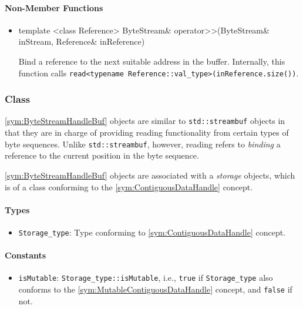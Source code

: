 \paragraph{Non-Member Functions}

\begin{itemize}
	\item
		\begin{cppsnippet}
		template <class Reference>
		ByteStream& operator>>(ByteStream& inStream, Reference& inReference)
		\end{cppsnippet}
		
		Bind a reference to the next suitable address in the buffer. Internally, this function calls \texttt{read<typename Reference::val\_type>(inReference.size())}.
\end{itemize}

\subsubsection[Class ByteStreamHandleBuf]{Class }

\ref{sym:ByteStreamHandleBuf} objects are similar to \texttt{std::streambuf} objects in that they are in charge of providing reading functionality from certain types of byte sequences. Unlike \texttt{std::streambuf}, however, reading refers to \emph{binding} a reference to the current position in the byte sequence.

\ref{sym:ByteStreamHandleBuf} objects are associated with a \emph{storage} objects, which is of a class conforming to the \ref{sym:ContiguousDataHandle} concept.

\paragraph{Types}

\begin{itemize}
	\item \texttt{Storage\_type}: Type conforming to \ref{sym:ContiguousDataHandle} concept.
\end{itemize}

\paragraph{Constants}

\begin{itemize}
	\item \texttt{isMutable}: \texttt{Storage\_type::isMutable}, i.e., \texttt{true} if \texttt{Storage\_type} also conforms to the \ref{sym:MutableContiguousDataHandle} concept, and \texttt{false} if not.
\end{itemize}


